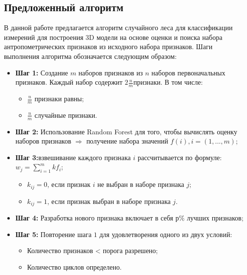 \subsection{Предложенный алгоритм}
В данной работе предлагается алгоритм случайного леса для классификации измерений для построения 3D модели на основе оценки и поиска набора антропометрических признаков из исходного набора признаков. Шаги выполнения алгоритма обозначается следующим образом:

\begin{itemize}
	\item \textbf{Шаг 1:} Создание $m$ наборов признаков из $n$ наборов первоначальных признаков. Каждый набор содержит $2 \frac{n}{m} $признаки. В том числе:
	
	\begin{itemize}
		\item  $\frac{n}{m}$ признаки равны;
		\item  $\frac{n}{m}$ случайные признаки.

	\end{itemize}
	
	\item \textbf{Шаг 2:} Использование Random Forest для того, чтобы вычислять оценку наборов признаков $\Rightarrow$ получение набора значений $f\left(i\right), i= \left(1,..., m\right)$;
	\item \textbf{Шаг 3:}взвешивание каждого признака $i$ рассчитывается по формуле:
	$w_j= \sum^m_{i=1}kf_i$;
	
	\begin{itemize}
		\item $k_{ij} = 0$, если признак $i$ не выбран в наборе признака $j$;
    \item $k_{ij}= 1$, если признак выбран в наборе признака $j$.
	\end{itemize}
	
	\item \textbf{Шаг 4:} Разработка нового признака включает в себя $р\%$ лучших признаков;
	\item \textbf{Шаг 5:} Повторение шага $1$ для удовлетворения одного из двух условий:
	
	\begin{itemize}
		\item Количество признаков < порога разрешено;
		\item Количество циклов определено.
	\end{itemize}
	
\end{itemize}

